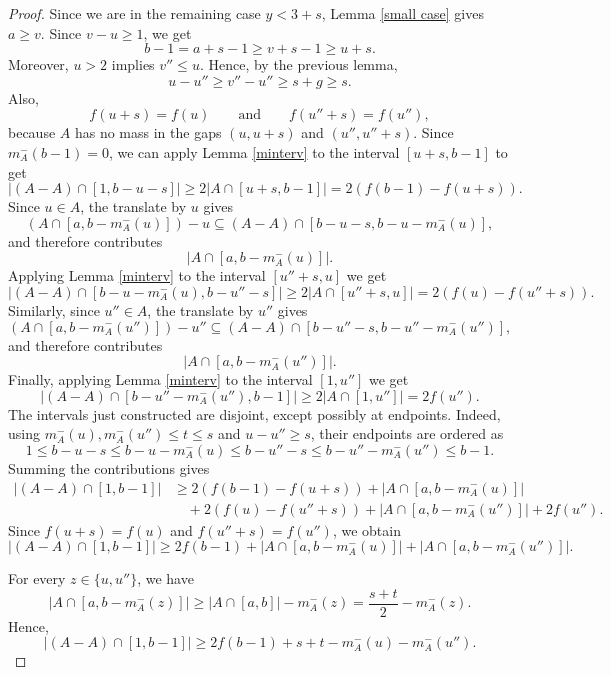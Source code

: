 \documentclass[10pt,a4paper]{amsart}
\def\F#1{f(#1)}
\begin{document}
\begin{proof}
     Since we are in the remaining case $y<3+s$, Lemma \ref{small case} gives $a\geq v$. Since $v-u\geq1$, we get
    $$
        b-1=a+s-1\geq v+s-1\geq u+s.
    $$
    Moreover, $u>2$ implies $v''\leq u$. Hence, by the previous lemma,
    $$
        u-u''\geq v''-u''\geq s+g\geq s.
    $$
    Also,
    $$
        \F{u+s}=\F{u}
        \qquad\text{and}\qquad
        \F{u''+s}=\F{u''},
    $$
    because $A$ has no mass in the gaps $(u,u+s)$ and $(u'',u''+s)$.
Since $m_A^-(b-1)=0$, we can apply Lemma \ref{minterv}
to the interval $[u+s,b-1]$ to get
$$
    |(A-A)\cap[1,b-u-s]|
    \geq 2|A\cap[u+s,b-1]|
    =
    2(\F{b-1}-\F{u+s}).
$$
Since $u\in A$, the translate by $u$ gives
    $$
        (A\cap[a,b-m_A^-(u)])-u
        \subseteq
        (A-A)\cap[b-u-s,b-u-m_A^-(u)],
    $$
    and therefore contributes
    $$
        |A\cap[a,b-m_A^-(u)]|.
    $$
    Applying Lemma \ref{minterv} to the interval $[u''+s,u]$ we get
$$
    |(A-A)\cap[b-u-m_A^-(u),b-u''-s]|
    \geq 2|A\cap[u''+s,u]|
    =
    2(\F{u}-\F{u''+s}).
$$
Similarly, since $u''\in A$, the translate by $u''$ gives
    $$
        (A\cap[a,b-m_A^-(u'')])-u''
        \subseteq
        (A-A)\cap[b-u''-s,b-u''-m_A^-(u'')],
    $$
    and therefore contributes
    $$
        |A\cap[a,b-m_A^-(u'')]|.
    $$
        Finally, applying Lemma \ref{minterv} to the interval $[1,u'']$ we get
    $$
        |(A-A)\cap[b-u''-m_A^-(u''),b-1]|
        \geq 2|A\cap[1,u'']|
        =
        2\F{u''}.
    $$
    The intervals just constructed are disjoint, except possibly at endpoints. Indeed, using
    $m_A^-(u),m_A^-(u'')\leq t\leq s$ and $u-u''\geq s$, their endpoints are ordered as
    $$
        1\leq b-u-s\leq b-u-m_A^-(u)
        \leq b-u''-s\leq b-u''-m_A^-(u'')\leq b-1.
    $$
    Summing the contributions gives
    \begin{align*}
        |(A-A)\cap[1,b-1]|
        &\geq
        2(\F{b-1}-\F{u+s})
        + |A\cap[a,b-m_A^-(u)]|\\
        &\quad
        +2(\F{u}-\F{u''+s})
        + |A\cap[a,b-m_A^-(u'')]|
        +2\F{u''}.
    \end{align*}
    Since $\F{u+s}=\F{u}$ and $\F{u''+s}=\F{u''}$, we obtain
    $$
        |(A-A)\cap[1,b-1]|
        \geq
        2\F{b-1}
        + |A\cap[a,b-m_A^-(u)]|
        + |A\cap[a,b-m_A^-(u'')]|.
    $$

    For every $z\in\{u,u''\}$, we have
    $$
        |A\cap[a,b-m_A^-(z)]|
        \geq
        |A\cap[a,b]|-m_A^-(z)
        =
        \frac{s+t}{2}-m_A^-(z).
    $$
    Hence,
    $$
        |(A-A)\cap[1,b-1]|
        \geq
        2\F{b-1}+s+t-m_A^-(u)-m_A^-(u'').
    $$


\end{proof}
\end{document}
